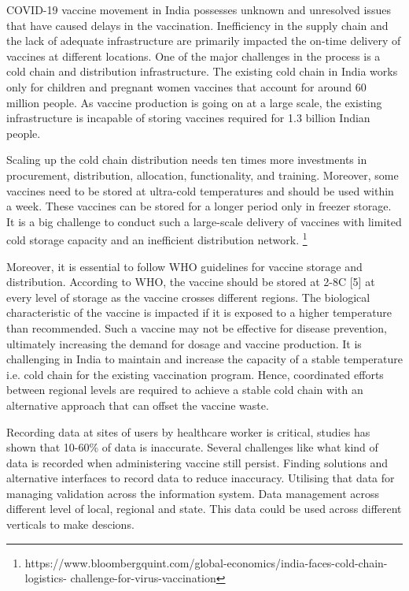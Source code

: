 \documentclass{article}
\begin{document}
COVID-19 vaccine movement in India possesses unknown and unresolved issues that have caused delays in the vaccination. Inefficiency in the supply chain and the lack of adequate infrastructure are primarily impacted the on-time delivery of vaccines at different locations. One of the major challenges in the process is a cold chain and distribution infrastructure. The existing cold chain in India works only for children and pregnant women vaccines that account for around 60 million people. As vaccine production is going on at a large scale, the existing infrastructure is incapable of storing vaccines required for 1.3 billion Indian people.  

Scaling up the cold chain distribution needs ten times more investments in procurement, distribution, allocation, functionality, and training. Moreover, some vaccines need to be stored at ultra-cold temperatures and should be used within a week. These vaccines can be stored for a longer period only in freezer storage. It is a big challenge to conduct such a large-scale delivery of vaccines with limited cold storage capacity and an inefficient distribution network. \footnote {https://www.bloombergquint.com/global-economics/india-faces-cold-chain-logistics- challenge-for-virus-vaccination}         

Moreover, it is essential to follow WHO guidelines for vaccine storage and distribution. According to WHO, the vaccine should be stored at 2-8\degree C [5] at every level of storage as the vaccine crosses different regions. The biological characteristic of the vaccine is impacted if it is exposed to a higher temperature than recommended. Such a vaccine may not be effective for disease prevention, ultimately increasing the demand for dosage and vaccine production. It is challenging in India to maintain and increase the capacity of a stable temperature i.e. cold chain for the existing vaccination program. Hence, coordinated efforts between regional levels are required to achieve a stable cold chain with an alternative approach that can offset the vaccine waste. 

Recording data at sites of users by healthcare worker is critical, studies has shown that 10-60\% of data is inaccurate\cite{atkinson2020digital}. Several challenges like what kind of data is recorded when administering vaccine still persist. Finding solutions and alternative interfaces to record data to reduce inaccuracy. Utilising that data for managing validation across the information system. Data management across different level of local, regional and state. This data could be used across different verticals to make descions.
\end{document}
